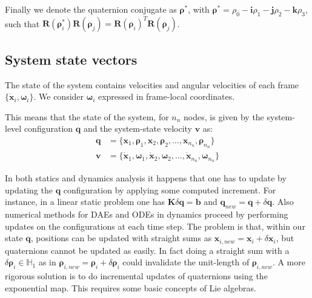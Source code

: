 \documentclass[review]{elsarticle}
\def\avect#1{{\boldsymbol{#1}}}
\def\amatr#1{{\boldsymbol{#1}}}
\begin{document}
Finally we denote the quaternion conjugate as $\avect{\rho}^*$, 
with $\avect{\rho}^*=\rho_{0}-\avect{i}\rho_{1}-\avect{j}\rho_{2}-\avect{k}\rho_{3}$,
such that $\amatr{R}(\avect{\rho}_i^*)\amatr{R}(\avect{\rho}_j) = \amatr{R}(\avect{\rho}_i)^T\amatr{R}(\avect{\rho}_j) $.


\subsection{System state vectors}

The state of the system contains velocities and angular velocities of each frame $\{ \dot{\avect{x}}_i, \avect{\omega}_i \}$. We consider $\avect{\omega}_i$ expressed in frame-local coordinates. 

This means that the state of the system, for $n_n$ nodes, is given by the system-level configuration $\avect{q}$ and the system-state velocity $\avect{v}$ as: 
%
\begin{align}
\avect{q} &= \{ \avect{x}_1, \avect{\rho}_1, \avect{x}_2, \avect{\rho}_2, \ldots, \avect{x}_{n_n}, \avect{\rho}_{n_n} \} \\ 
\avect{v} &= \{ \dot{\avect{x}}_1, \avect{\omega}_1, \dot{\avect{x}}_2, \avect{\omega}_2, \ldots, \dot{\avect{x}}_{n_n}, \avect{\omega}_{n_n} \}
\end{align}
%

In both statics and dynamics analysis it happens that one has to update by updating the $\avect{q}$ configuration by applying some computed increment. For instance, in a linear static problem one has $\amatr{K} \delta\avect{q}=\avect{b}$ and $\avect{q}_{new} = \avect{q} + \delta\avect{q}$. Also numerical methods for DAEs and ODEs in dynamics proceed by performing updates on the configurations at each time step. The problem is that, within our state $\avect{q}$, positions can be updated with straight sums as 
$\avect{x}_{i,new} = \avect{x}_i + \delta\avect{x}_i$, but quaternions cannot be updated as easily. In fact doing a straight sum with a $\delta\avect{\rho}_{i} \in \mathbb{H}_1$ as in $\avect{\rho}_{i,new} = \avect{\rho}_{i} + \delta\avect{\rho}_{i}$ could invalidate the unit-length of $\avect{\rho}_{i,new}$. A more rigorous solution is to do incremental updates of quaternions using the exponential map. This requires some basic concepts of Lie algebras.
\end{document}
